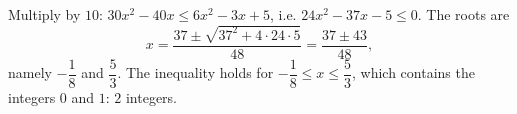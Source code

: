 Multiply by $10$: $30x^2-40x\le6x^2-3x+5$, i.e. $24x^2-37x-5\le0$. The roots are
\[x=\dfrac{37\pm\sqrt{37^2+4\cdot24\cdot5}}{48}=\dfrac{37\pm43}{48},\]
namely $-\dfrac{1}{8}$ and $\dfrac{5}{3}$. The inequality holds for $-\dfrac{1}{8}\le x\le\dfrac{5}{3}$, which contains the integers $0$ and $1$: $\boxed{2}$ integers.

